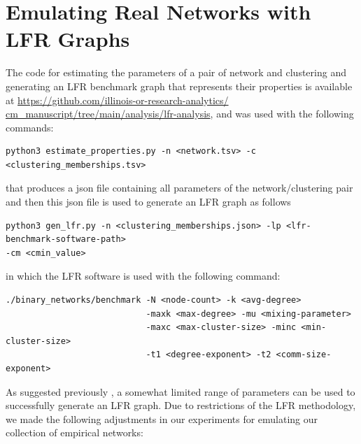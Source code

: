 \documentclass[a4paper]{article}   	%
\begin{document}
\clearpage
\section{Emulating Real Networks with LFR Graphs}
 The code for estimating the parameters of a pair of network and clustering and generating an LFR benchmark graph that represents their properties is available at \href{https://github.com/illinois-or-research-analytics/cm_manuscript/tree/main/analysis/lfr-analysis}{https://github.com/illinois-or-research-analytics/} \href{https://github.com/illinois-or-research-analytics/cm_manuscript/tree/main/analysis/lfr-analysis}{cm\_manuscript/tree/main/analysis/lfr-analysis}, and was used with the following commands:

\begin{lstlisting}[basicstyle=\ttfamily\small]
python3 estimate_properties.py -n <network.tsv> -c <clustering_memberships.tsv>
\end{lstlisting}
that produces a json file containing all parameters of the network/clustering pair and then this json file is used to generate an LFR graph as follows

\begin{lstlisting}[basicstyle=\ttfamily\small]
python3 gen_lfr.py -n <clustering_memberships.json> -lp <lfr-benchmark-software-path>
-cm <cmin_value>
\end{lstlisting}

\noindent
in which the LFR software \citep{lancichinetti2008benchmark} is used with the following command:

\begin{lstlisting}[basicstyle=\ttfamily\small]
./binary_networks/benchmark -N <node-count> -k <avg-degree>
                            -maxk <max-degree> -mu <mixing-parameter>
                            -maxc <max-cluster-size> -minc <min-cluster-size>
                            -t1 <degree-exponent> -t2 <comm-size-exponent>
\end{lstlisting}



As suggested previously \citep{hagberg2008exploring}, a somewhat limited range of parameters can be used to successfully generate an LFR graph. Due to restrictions of the LFR methodology, we made the following adjustments in our experiments for emulating our collection of empirical networks:
\end{document}

